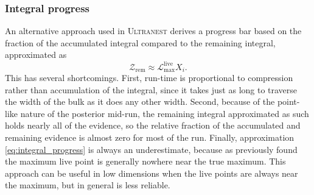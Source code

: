 \documentclass[usenatbib]{mnras}
\newcommand{\Like}{\mathcal{L}}
\begin{document}
\subsubsection{Integral progress}
An alternative approach used in \textsc{Ultranest} \citep{ultranest} derives a progress bar based on the fraction of the accumulated integral compared to the remaining integral, approximated as 
\begin{equation}\label{eq:integral_progress}
    \mathcal{Z}_\mathrm{rem} \approx \Like_\mathrm{max}^{\mathrm{live}} X_i.
\end{equation}
This has several shortcomings. First, run-time is proportional to compression rather than accumulation of the integral, since it takes just as long to traverse the width of the bulk as it does any other width. Second, because of the point-like nature of the posterior mid-run, the remaining integral approximated as such holds nearly all of the evidence, so the relative fraction of the accumulated and remaining evidence is almost zero for most of the run. Finally, approximation \cref{eq:integral_progress} is always an underestimate, because as previously found the maximum live point is generally nowhere near the true maximum. This approach can be useful in low dimensions when the live points are always near the maximum, but in general is less reliable.
\end{document}
